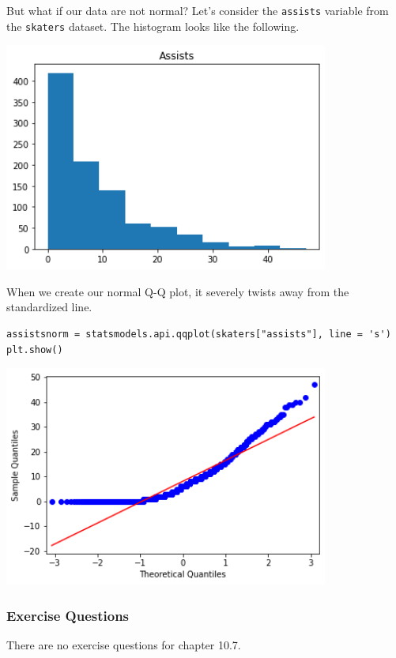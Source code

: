 But what if our data are not normal? Let's consider the \verb|assists| variable from the \verb|skaters| dataset. The histogram looks like the following.

\includegraphics[width = 0.8\textwidth]{img/hist2.png}

When we create our normal Q-Q plot, it severely twists away from the standardized line.\par
\begin{lstlisting}[style=pippython]
assistsnorm = statsmodels.api.qqplot(skaters["assists"], line = 's')
plt.show()
\end{lstlisting}

\includegraphics[width = 0.8\textwidth]{img/hist8.png}

\subsubsection*{Exercise Questions}
There are no exercise questions for chapter 10.7.